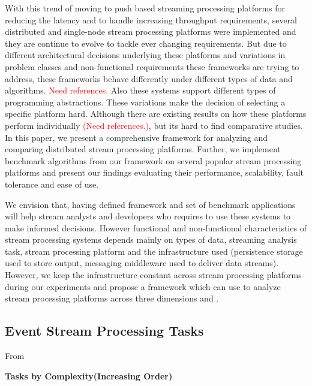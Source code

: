 \documentclass{sig-alternate}
\begin{document}
With this trend of moving to push based streaming processing platforms
for reducing the latency and to handle increasing throughput
requirements, several distributed and single-node stream processing
platforms were implemented and they are continue to evolve to tackle
ever changing requirements. But due to different architectural
decisions underlying these platforms and variations in problem classes and
non-functional requirements these frameworks are trying to address,
these frameworks behave differently under different types of data and
algorithms. \textcolor{Red}{Need references.} Also these systems
support different types of programming abstractions. These variations
make the decision of selecting a specific platform hard. Although
there are existing results on how these platforms perform
individually \textcolor{Red}{(Need references.)}, but its hard to find
comparative studies. In this paper, we present a comprehensive
framework for analyzing and comparing distributed stream processing
platforms. Further, we implement benchmark algorithms from our
 framework on several popular stream processing platforms and present
 our findings evaluating their performance, scalability, fault tolerance
 and ease of use.

 We envision that, having defined framework and set of benchmark applications
 will help stream analysts and developers who requires to use these systems to
 make informed decisions. However functional and non-functional characteristics
 of stream processing systems depends mainly on types of data, streaming analysis
 task, stream processing platform and the infrastructure used (persistence storage
 used to store output, messaging middleware used to deliver data streams). However,
 we keep the infrastructure constant across stream processing platforms during our
 experiments and propose a framework which can use to analyze stream processing
 platforms across three dimensions  and .








 \subsection{Event Stream Processing Tasks}


From~\cite{streamdrill:presentation}

 \textbf{Tasks by Complexity(Increasing Order)}
\end{document}
